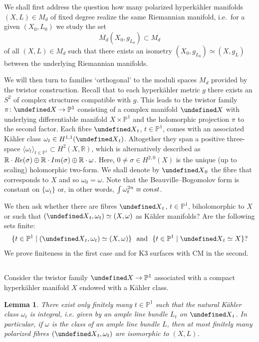 \documentclass[11pt]{article}
\newtheorem{lemm}[theo]{Lemma}
\theoremstyle{definition}
\numberwithin{equation}{section}
\numberwithin{figure}{section}
\numberwithin{table}{section}
\let\cal\undefined
\newcommand{\cal}{\mathcal}
\newcommand{\kx}{{\cal X}}
\newcommand{\RR}{\mathbb{R}}
\newcommand{\PP}{\mathbb{P}}
\renewcommand{\cong}{\simeq}
\begin{document}
We shall first address the question how many polarized hyperk\"ahler manifolds $(X,L)\in M_d$ of fixed degree realize the same Riemannian manifold, i.e.\
for a given $(X_0,L_0)$ we study the set
\[
M_d(X_0,g_{L_0})\subset M_d
\]
of all
$(X,L)\in M_d$ such that there exists an isometry $(X_0,g_{L_0})\cong (X,g_L)$ between the underlying Riemannian manifolds.

We will then turn to families `orthogonal' to the moduli spaces $M_d$ provided by the twistor construction. Recall that to each hyperk\"ahler metric $g$ there exists an $S^2$ of complex structures compatible with $g$. This leads to the twistor family $\pi\colon\kx\to\PP^1$ consisting of a complex manifold $\kx$ with underlying differentiable manifold $X\times \PP^1$ and the holomorphic projection $\pi$ to the second factor. Each fibre $\kx_t$, $t\in\PP^1$, comes with an associated K\"ahler class $\omega_t\in H^{1,1}(\kx_t)$. Altogether they span a positive three-space $\langle\omega_t\rangle_{t\in\PP^1}\subset H^2(X,\RR)$, which is alternatively described as $\RR\cdot{\rm Re}(\sigma)\oplus\RR\cdot{\rm Im}(\sigma)\oplus\RR\cdot\omega$. Here, $0\ne\sigma\in H^{2,0}(X)$ is the unique (up to scaling) holomorphic two-form. We shall denote by $\kx_0$ the fibre that corresponds to $X$ and so $\omega_0=\omega$. Note that the Beauville--Bogomolov form is constant on $\{\omega_t\}$ or, in other words, $\int\omega_t^{2n}\equiv{\rm const}$.

We then ask whether there are fibres $\kx_t$, $t\in\PP^1$, biholomorphic to $X$ or such that $(\kx_{t},\omega_{t})\cong(X,\omega)$ as K\"ahler manifolds? Are the following sets finite:
\[
\{t\in\PP^1\mid (\kx_t,\omega_t)\cong (X,\omega)\}\text{~~and~~} \{t\in\PP^1\mid \kx_t\cong X\}?
\]
We prove finiteness in
the first case and for K3 surfaces with CM in the second.

\subsection{}
Consider the twistor family $\kx\to\PP^1$ associated with a compact hyperk\"ahler manifold $X$ endowed with a K\"ahler class.

\begin{lemm}\label{lem:key}
There exist only finitely many $t\in \PP^1$ such that
the natural K\"ahler class $\omega_t$ is integral, i.e. given by an ample line bundle $L_t$ on $\kx_t$. In particular, if $\omega$ is the class of an ample line bundle $L$, then at most finitely many polarized fibres $(\kx_t,\omega_t)$ are isomorphic to $(X,L)$.
\end{lemm}
\end{document}
